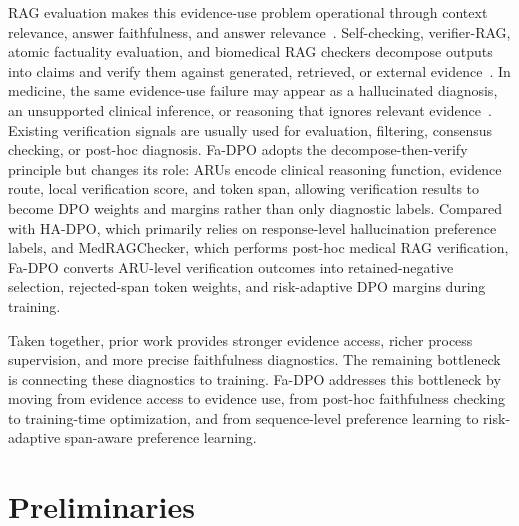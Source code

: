\documentclass[a4paper,fleqn,doubleblind]{cas-sc}
\begin{document}
RAG evaluation makes this evidence-use problem operational through context relevance, answer faithfulness, and answer relevance~\cite{saadfalcon2024ares}.
Self-checking, verifier-RAG, atomic factuality evaluation, and biomedical RAG checkers decompose outputs into claims and verify them against generated, retrieved, or external evidence~\cite{manakul2023selfcheckgpt, phasook2025vereafine, min-etal-2023-factscore, wei2024longform, song-etal-2024-veriscore, ji2026medragchecker}.
In medicine, the same evidence-use failure may appear as a hallucinated diagnosis, an unsupported clinical inference, or reasoning that ignores relevant evidence~\cite{li2023hallucination, ji2023survey}.
Existing verification signals are usually used for evaluation, filtering, consensus checking, or post-hoc diagnosis.
Fa-DPO adopts the decompose-then-verify principle but changes its role: ARUs encode clinical reasoning function, evidence route, local verification score, and token span, allowing verification results to become DPO weights and margins rather than only diagnostic labels.
Compared with HA-DPO, which primarily relies on response-level hallucination preference labels, and MedRAGChecker, which performs post-hoc medical RAG verification, Fa-DPO converts ARU-level verification outcomes into retained-negative selection, rejected-span token weights, and risk-adaptive DPO margins during training.

Taken together, prior work provides stronger evidence access, richer process supervision, and more precise faithfulness diagnostics.
The remaining bottleneck is connecting these diagnostics to training.
Fa-DPO addresses this bottleneck by moving from evidence access to evidence use, from post-hoc faithfulness checking to training-time optimization, and from sequence-level preference learning to risk-adaptive span-aware preference learning.

\section{Preliminaries}
\label{sec:preliminaries}
\end{document}
